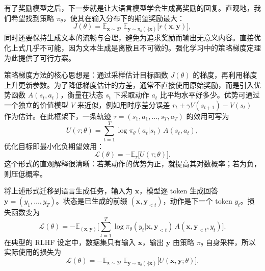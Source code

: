 \documentclass{article}
\begin{document}
\label{sec:rlhf-training-llms}

有了奖励模型之后，下一步就是让大语言模型学会生成高奖励的回复。直观地，我们希望找到策略 \(\pi_{\theta}\)，使其在输入分布下的期望奖励最大：
\begin{equation}
J(\theta) = \mathbb{E}_{\mathbf{x}\sim\mathcal{D}}\;\mathbb{E}_{\mathbf{y}\sim\pi_{\theta}(\cdot|\mathbf{x})}\big[r(\mathbf{x},\mathbf{y})\big],
\end{equation}
同时还要保持生成文本的流畅与合理，避免为追求奖励而输出无意义内容。直接优化上式几乎不可能，因为文本生成是离散且不可微的。强化学习中的策略梯度定理为此提供了可行方案。

策略梯度方法的核心思想是：通过采样估计目标函数 \(J(\theta)\) 的梯度，再利用梯度上升更新参数。为了降低梯度估计的方差，通常不直接使用原始奖励，而是引入优势函数 \(A(s_t,a_t)\)，衡量在状态 \(s_t\) 下采取动作 \(a_t\) 比平均水平好多少。优势可通过一个独立的价值模型 \(V\) 来近似，例如用时序差分误差 \(r_t + \gamma V(s_{t+1}) - V(s_t)\) 作为估计。在此框架下，一条轨迹 \(\tau=(s_1,a_1,\dots,s_T,a_T)\) 的效用可写为
\begin{equation}
U(\tau;\theta) = \sum_{t=1}^{T} \log \pi_{\theta}(a_t|s_t)\,A(s_t,a_t),
\end{equation}
优化目标即最小化负期望效用：
\begin{equation}
\mathcal{L}(\theta) = -\mathbb{E}_{\tau}\big[U(\tau;\theta)\big].
\end{equation}
这个形式的直观解释很清晰：若某动作的优势为正，就提高其对数概率；若为负，则压低概率。

将上述形式迁移到语言生成任务，输入为 \(\mathbf{x}\)，模型逐 token 生成回答 \(\mathbf{y}=(y_1,\dots,y_T)\)。状态是已生成的前缀 \((\mathbf{x},\mathbf{y}_{<t})\)，动作是下一个 token \(y_t\)。损失函数变为
\begin{equation}
\mathcal{L}(\theta) = -\mathbb{E}_{(\mathbf{x},\mathbf{y})}\Big[\sum_{t=1}^{T} \log \pi_{\theta}(y_t|\mathbf{x},\mathbf{y}_{<t})\,A(\mathbf{x},\mathbf{y}_{<t},y_t)\Big].
\end{equation}
在典型的 RLHF 设定中，数据集只有输入 \(\mathbf{x}\)，输出 \(\mathbf{y}\) 由策略 \(\pi_{\theta}\) 自身采样，所以实际使用的损失为
\begin{equation}
\mathcal{L}(\theta) = -\mathbb{E}_{\mathbf{x}\sim\mathcal{D}}\;\mathbb{E}_{\mathbf{y}\sim\pi_{\theta}(\cdot|\mathbf{x})}\Big[U(\mathbf{x},\mathbf{y};\theta)\Big].
\end{equation}
\end{document}
